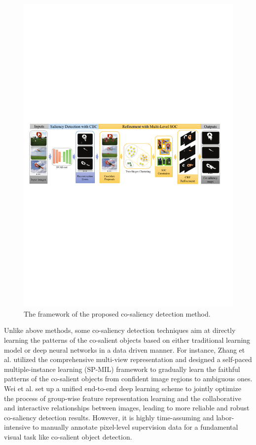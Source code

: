 \documentclass[sigconf]{acmart}
\begin{document}
\begin{figure}[!ht]
\centering
\includegraphics[scale=1.03]{Fig2.pdf}
\caption{The framework of the proposed co-saliency detection method.}
\label{fig:label}
\end{figure}


Unlike above methods, some co-saliency detection techniques aim at directly learning the patterns of the co-salient objects based on either traditional learning model \cite{han2017unified,zhang2017co,DBLP:conf/mm/ZhengZZ18} or deep neural networks \cite{DBLP:conf/ijcai/WeiZBLW17} in a data driven manner. For instance, Zhang et al. \cite{zhang2017co} utilized the comprehensive multi-view representation and designed a self-paced multiple-instance learning (SP-MIL) framework to gradually learn the faithful patterns of the co-salient objects from confident image regions to ambiguous ones.
Wei et al. \cite{DBLP:conf/ijcai/WeiZBLW17} set up a unified end-to-end deep learning scheme to jointly optimize the process of group-wise feature representation learning and the collaborative and interactive relationships between images, leading to more reliable and robust co-saliency detection results. However, it is highly time-assuming and labor-intensive to manually annotate pixel-level supervision data for a fundamental visual task like co-salient object detection.
\end{document}
